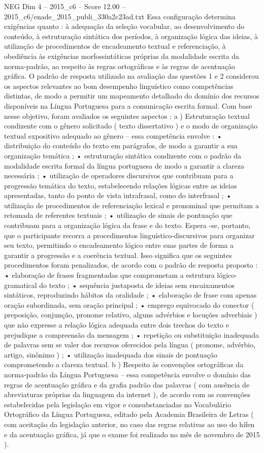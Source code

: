 \begin{textsample}{NEG Dim 4 – 2015\_c6 – Score 12.00 – 2015\_c6/enade\_2015\_publi\_330a2c23ad.txt}
Essa configuração determina exigências quanto : à adequação da seleção vocabular, ao desenvolvimento do conteúdo, à estruturação sintática dos períodos, à organização lógica das ideias, à utilização de procedimentos de encadeamento textual e referenciação, à obediência às exigências morfossintáticas próprias da modalidade escrita da norma-padrão, ao respeito às regras ortográficas e às regras de acentuação gráfica.
O padrão de resposta utilizado na avaliação das questões 1 e 2 considerou os aspectos relevantes ao bom desempenho linguístico como competências distintas, de modo a permitir um mapeamento detalhado do domínio dos recursos disponíveis na Língua Portuguesa para a comunicação escrita formal.
Com base nesse objetivo, foram avaliados os seguintes aspectos : a ) Estruturação textual condizente com o gênero solicitado ( texto dissertativo ) e o modo de organização textual expositivo adequado ao gênero – essa competência envolve : • distribuição do conteúdo do texto em parágrafos, de modo a garantir a sua organização temática ; • estruturação sintática condizente com o padrão da modalidade escrita formal da língua portuguesa de modo a garantir a clareza necessária ; • utilização de operadores discursivos que contribuam para a progressão temática do texto, estabelecendo relações lógicas entre as ideias apresentadas, tanto do ponto de vista intrafrasal, como do interfrasal ; • utilização de procedimentos de referenciação lexical e pronominal que permitam a retomada de referentes textuais ; • utilização de sinais de pontuação que contribuam para a organização lógica da frase e do texto.
Espera -se, portanto, que o participante recorra a procedimentos linguístico-discursivos para organizar seu texto, permitindo o encadeamento lógico entre suas partes de forma a garantir a progressão e a coerência textual.
Isso significa que os seguintes procedimentos foram penalizados, de acordo com o padrão de resposta proposto : • elaboração de frases fragmentadas que comprometam a estrutura lógico-gramatical do texto ; • sequência justaposta de ideias sem encaixamentos sintáticos, reproduzindo hábitos da oralidade ; • elaboração de frase com apenas oração subordinada, sem oração principal ; • emprego equivocado do conector ( preposição, conjunção, pronome relativo, alguns advérbios e locuções adverbiais ) que não expresse a relação lógica adequada entre dois trechos do texto e prejudique a compreensão da mensagem ; • repetição ou substituição inadequada de palavras sem se valer dos recursos oferecidos pela língua ( pronome, advérbio, artigo, sinônimo ) ; • utilização inadequada dos sinais de pontuação comprometendo a clareza textual. b ) Respeito às convenções ortográficas da norma-padrão da Língua Portuguesa – essa competência envolve o domínio das regras de acentuação gráfica e da grafia padrão das palavras ( com ausência de abreviaturas próprias da linguagem da internet ), de acordo com as convenções estabelecidas pela legislação em vigor e consubstanciadas no Vocabulário Ortográfico da Língua Portuguesa, editado pela Academia Brasileira de Letras ( com aceitação da legislação anterior, no caso das regras relativas ao uso do hífen e da acentuação gráfica, já que o exame foi realizado no mês de novembro de 2015 ).

\end{textsample}
